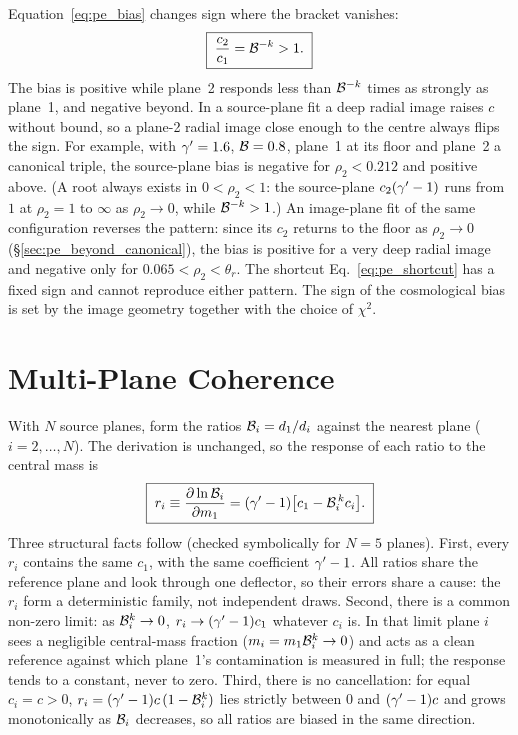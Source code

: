 Equation~\eqref{eq:pe_bias} changes sign where the bracket vanishes:
\begin{equation}
    \boxed{\;\frac{c_2}{c_1}=\mathcal{B}^{-k}>1.\;}
    \label{eq:pe_sign}
\end{equation}
The bias is positive while plane~2 responds less than $\mathcal{B}^{-k}$ times
as strongly as plane~1, and negative beyond. In a source-plane fit a
deep radial image raises $c$ without bound, so a plane-2 radial image
close enough to the centre always flips the sign. For example, with
$\gamma'=1.6$, $\mathcal{B}=0.8$, plane~1 at its floor and plane~2 a canonical
triple, the source-plane bias is negative for $\rho_2<0.212$ and
positive above. (A root always exists in $0<\rho_2<1$: the source-plane
$c_2(\gamma'-1)$ runs from $1$ at $\rho_2=1$ to $\infty$ as $\rho_2\to0$,
while $\mathcal{B}^{-k}>1$.) An image-plane fit of the same configuration
reverses the pattern: since its $c_2$ returns to the floor as
$\rho_2\to0$ (\S\ref{sec:pe_beyond_canonical}), the bias is positive for
a very deep radial image and negative only for $0.065<\rho_2<\theta_r$.
The shortcut Eq.~\eqref{eq:pe_shortcut} has a fixed sign and cannot
reproduce either pattern. The sign of the cosmological bias is set by
the image geometry together with the choice of $\chi^2$.

\section{Multi-Plane Coherence}
\label{sec:pe_coherence}

With $N$ source planes, form the ratios $\mathcal{B}_i=d_1/d_i$ against the
nearest plane ($i=2,\dots,N$). The derivation is unchanged, so the
response of each ratio to the central mass is
\begin{equation}
    \boxed{\;
    r_i\equiv\frac{\partial \ln\mathcal{B}_i}{\partial m_1}=(\gamma'-1)\bigl[c_1-\mathcal{B}_i^{\,k}c_i\bigr].\;}
    \label{eq:pe_ri}
\end{equation}
Three structural facts follow (checked symbolically for $N=5$ planes).
First, every $r_i$ contains the same $c_1$, with the same coefficient
$\gamma'-1$. All ratios share the reference plane and look through one
deflector, so their errors share a cause: the $r_i$ form a
deterministic family, not independent draws. Second, there is a common
non-zero limit: as $\mathcal{B}_i^{k}\to0$, $r_i\to(\gamma'-1)c_1$ whatever $c_i$
is. In that limit plane $i$ sees a negligible central-mass fraction
($m_i=m_1\mathcal{B}_i^{k}\to0$) and acts as a clean reference against
which plane~1's contamination is measured in full; the response tends
to a constant, never to zero. Third, there is no cancellation: for equal
$c_i=c>0$, $r_i=(\gamma'-1)c\,(1-\mathcal{B}_i^{k})$ lies strictly between $0$ and
$(\gamma'-1)c$ and grows monotonically as $\mathcal{B}_i$ decreases, so all
ratios are biased in the same direction.

